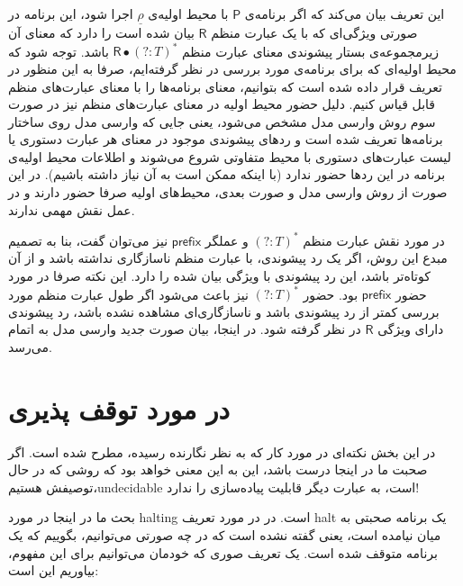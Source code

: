 این تعریف بیان می‌کند که اگر برنامه‌ی 
$\mathsf{P}$
با محیط اولیه‌ی 
$\underline{\rho}$
اجرا شود، این برنامه در صورتی ویژگی‌ای که با یک عبارت منظم 
$\mathsf{R}$
بیان شده است را دارد که معنای آن زیرمجموعه‌ی بستار پیشوندی معنای عبارت منظم
$\mathsf{R} \bullet (?:\mathit{T})^*$
باشد.
توجه شود که محیط اولیه‌ای که برای برنامه‌ی مورد بررسی در نظر گرفته‌ایم، صرفا به این منظور در تعریف قرار داده شده است که بتوانیم،  معنای برنامه‌ها را با معنای عبارت‌های منظم قابل قیاس کنیم. دلیل حضور محیط اولیه در معنای عبارت‌های منظم نیز در صورت سوم روش وارسی مدل مشخص می‌شود، یعنی جایی که وارسی مدل روی ساختار برنامه‌ها تعریف شده است و ردهای پیشوندی موجود در معنای هر عبارت دستوری یا لیست عبارت‌های دستوری با محیط متفاوتی شروع می‌شوند و اطلاعات محیط اولیه‌ی برنامه در این ردها حضور ندارد (با اینکه ممکن است به آن نیاز داشته باشیم). در این صورت از روش وارسی مدل و صورت بعدی، محیط‌های اولیه صرفا حضور دارند و در عمل نقش مهمی ندارند. 

در مورد نقش عبارت منظم
$ (?:\mathit{T})^*$
و عملگر
$ \mathsf{prefix} $
نیز می‌توان گفت، بنا به تصمیم مبدع این روش، اگر یک رد پیشوندی، با عبارت منظم ناسازگاری نداشته باشد و از آن کوتاه‌تر باشد، این رد پیشوندی با ویژگی بیان شده را دارد. این نکته صرفا در مورد حضور 
$\mathsf{prefix}$ 
بود. حضور 
$(?:\mathit{T})^*$
نیز باعث می‌شود اگر طول عبارت منظم مورد بررسی کمتر از رد پیشوندی باشد و ناسازگاری‌ای مشاهده نشده باشد، رد پیشوندی دارای ویژگی $\mathsf{R}$ در نظر گرفته شود.
در اینجا، بیان صورت جدید وارسی مدل به اتمام می‌رسد.
\section{در مورد توقف پذیری}

در این بخش نکته‌ای در مورد کار که به نظر نگارنده رسیده، مطرح شده است. اگر صحبت ما در اینجا درست باشد، این به این معنی خواهد بود که روشی که در حال توصیفش هستیم،\gls*{undecidable} است، به عبارت دیگر قابلیت پیاده‌سازی را ندارد!

بحث ما در اینجا در مورد \gls*{halting} است. در \cite{calcul} در مورد تعریف \gls*{halt} یک برنامه صحبتی به میان نیامده است، یعنی گفته نشده است که در چه صورتی می‌توانیم، بگوییم که یک برنامه متوقف شده است. یک تعریف  صوری که خودمان می‌توانیم برای این مفهوم، بیاوریم این است:

